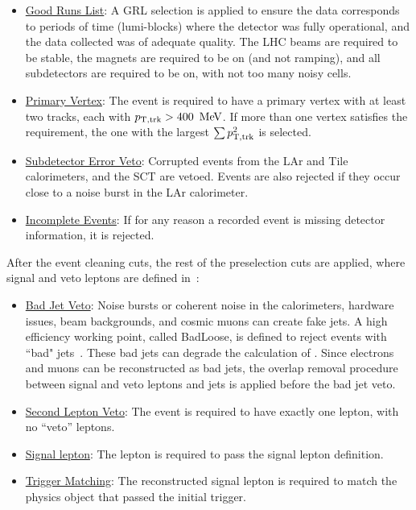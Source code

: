 \begin{itemize}
\item\underline{Good Runs List}: A GRL selection is applied to ensure the data corresponds to periods of time (lumi-blocks) where the detector was fully operational, and the data collected was of adequate quality. The LHC beams are required to be stable, the magnets are required to be on (and not ramping), and all subdetectors are required to be on, with not too many noisy cells.
\item\underline{Primary Vertex}: The event is required to have a primary vertex with at least two tracks, each with $p_{\rm T, trk}>400\,\MeV$. If more than one vertex satisfies the requirement, the one with the largest $\sum p_{\rm T, trk}^2$ is selected. 
\item\underline{Subdetector Error Veto}: Corrupted events from the LAr and Tile calorimeters, and the SCT are vetoed. Events are also rejected if they occur close to a noise burst in the LAr calorimeter. 
\item\underline{Incomplete Events}: If for any reason a recorded event is missing detector information, it is rejected.
\end{itemize}

After the event cleaning cuts, the rest of the preselection cuts are applied, where signal and veto leptons are defined in~\Ch{\ref{ch:objreco}}:

\begin{itemize}
	\item\underline{Bad Jet Veto}: Noise bursts or coherent noise in the calorimeters, hardware issues, beam backgrounds, and cosmic muons can create fake jets. A high efficiency working point, called BadLoose, is defined to reject events with ``bad" jets~\cite{bad_jet}. These bad jets can degrade the calculation of \MET. Since electrons and muons can be reconstructed as bad jets, the overlap removal procedure between signal and veto leptons and jets is applied before the bad jet veto.  %
    \item\underline{Second Lepton Veto}: The event is required to have exactly one lepton, with no ``veto'' leptons.
 	\item\underline{Signal lepton}: The lepton is required to pass the signal lepton definition.
	\item\underline{Trigger Matching}: The reconstructed signal lepton is required to match the physics object that passed the initial trigger. 
\end{itemize}

